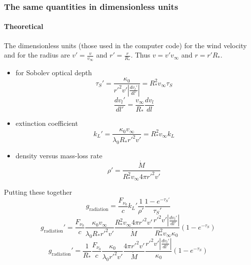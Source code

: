 \documentclass[../main/main.tex]{subfiles}
\begin{document}
\newpage
\subsubsection{The same quantities in dimensionless units}
\paragraph{Theoretical}
The dimensionless units (those used in the computer code) for the wind velocity and for the radius are  $v' = \frac{v}{v_{\infty}}$
and $r' = \frac{r}{R_*}$. Thus $v = v' v_{\infty}$ and $r = r'R_*$. 

\begin{itemize}
\item for Sobolev optical depth
\begin{equation}
\tau_S' = \frac{\kappa_0}{r'^2 v' \left| \frac{dv_l'}{dl'} \right| } = R_*^2 v_{\infty} \tau_S
\end{equation}
\begin{equation}
\frac{dv_l'}{dl'} = \frac{v_{\infty}}{R_*}\frac{dv_l}{dl}
\end{equation}

\item extinction coefficient 
\begin{equation}
k_L' 
= \frac{\kappa_0 v_{\infty}}{\lambda_0 R_* r'^2 v'} 
= R_*^2 v_{\infty} k_L
\end{equation}

\item density versus mass-loss rate
\begin{equation}
\rho' = \frac{\dot{M}}{R_*^2 v_{\infty} 4 \pi r'^2 v'}
\end{equation}
\end{itemize}
Putting these together
\begin{equation}
g_{\text{radiation}} = \frac{F_{\nu_0}}{c}  k_L' \frac{1}{\rho'}\frac{1- e^{-\tau_S'}}{\tau_S'}  
\end{equation}
\begin{equation}
g_{\text{radiation}}' =   
\frac{F_{\nu_0}}{c} 
\frac{\kappa_0 v_{\infty}}{\lambda_0 R_* r'^2 v'} 
\frac{R_*^2 v_{\infty} 4 \pi r'^2 v'}{\dot{M}}  
\frac{r'^2 v' \left | \frac{dv_l'}{dl'} \right| }{R_*^2 v_{\infty}\kappa_0} \left( 1- e^{-\tau_S} \right)
\end{equation}
\begin{equation}
\boxed{
g_{\text{radiation}}' =   
\frac{1}{R_*}
\frac{F_{\nu_0}}{c} 
\frac{\kappa_0}{\lambda_0 r'^2 v'} 
\frac{4 \pi r'^2 v'}{\dot{M}}  
\frac{r'^2 v' \left | \frac{dv_l'}{dl'} \right| }{\kappa_0} \left( 1- e^{-\tau_S} \right)}
\end{equation}
\end{document}
